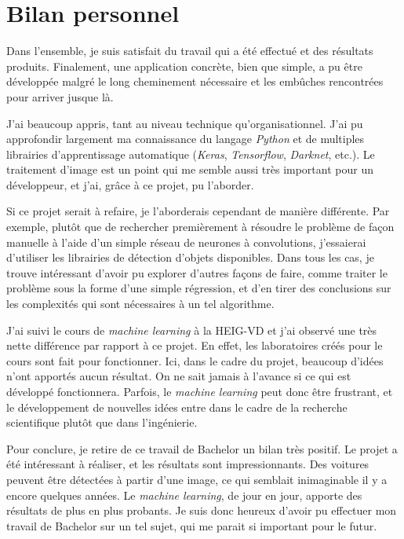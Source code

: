 \section{Bilan personnel}

Dans l'ensemble, je suis satisfait du travail qui a été effectué et des résultats produits. Finalement, une application concrète, bien que simple, a pu être développée malgré le long cheminement nécessaire et les embûches rencontrées pour arriver jusque là. 

J'ai beaucoup appris, tant au niveau technique qu'organisationnel. J'ai pu approfondir largement ma connaissance du langage \textit{Python} et de multiples librairies d'apprentissage automatique (\textit{Keras}, \textit{Tensorflow}, \textit{Darknet}, etc.). Le traitement d'image est un point qui me semble aussi très important pour un développeur, et j'ai, grâce à ce projet, pu l'aborder.

Si ce projet serait à refaire, je l'aborderais cependant de manière différente. Par exemple, plutôt que de rechercher premièrement à résoudre le problème de façon manuelle à l'aide d'un simple réseau de neurones à convolutions, j'essaierai d'utiliser les librairies de détection d'objets disponibles. Dans tous les cas, je trouve intéressant d'avoir pu explorer d'autres façons de faire, comme traiter le problème sous la forme d'une simple régression, et d'en tirer des conclusions sur les complexités qui sont nécessaires à un tel algorithme. 

J'ai suivi le cours de \textit{machine learning} à la HEIG-VD et j'ai observé une très nette différence par rapport à ce projet. En effet, les laboratoires créés pour le cours sont fait pour fonctionner. Ici, dans le cadre du projet, beaucoup d'idées n'ont apportés aucun résultat. On ne sait jamais à l'avance si ce qui est développé fonctionnera. Parfois, le \textit{machine learning} peut donc être frustrant, et le développement de nouvelles idées entre dans le cadre de la recherche scientifique plutôt que dans l'ingénierie. 

Pour conclure, je retire de ce travail de Bachelor un bilan très positif. Le projet a été intéressant à réaliser, et les résultats sont impressionnants. Des voitures peuvent être détectées à partir d'une image, ce qui semblait inimaginable il y a encore quelques années. Le \textit{machine learning}, de jour en jour, apporte des résultats de plus en plus probants. Je suis donc heureux d'avoir pu effectuer mon travail de Bachelor sur un tel sujet, qui me parait si important pour le futur.